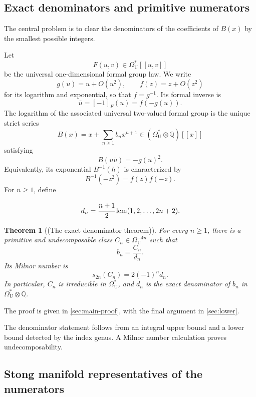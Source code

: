 \documentclass[14pt,dvipsnames]{extarticle}
\numberwithin{equation}{subsection}
\theoremstyle{plain}
\newtheorem{theorem}[theorem]{Theorem}
\theoremstyle{definition}
\theoremstyle{definition}
\DeclareMathOperator{\lcm}{lcm}
\newcommand{\OmU}{\Omega_{\mathrm U}^{\ast}}
\newcommand{\Uu}{\mathrm{U}}
\begin{document}
\subsection{Exact denominators and primitive numerators}

The central problem is to clear the denominators of the coefficients of
$B(x)$ by the smallest possible integers.

Let
\[
 F(u,v)\in\OmU[[u,v]]
\]
be the universal one-dimensional formal group law.  We write
\[
 g(u)=u+O(u^2),\qquad f(z)=z+O(z^2)
\]
for its logarithm and exponential, so that $f=g^{-1}$.  Its formal inverse is
\[
 \bar u=[-1]_F(u)=f(-g(u)).
\]
The logarithm of the associated universal two-valued formal group is the
unique strict series
\[
 B(x)=x+\sum_{n\geq1}b_nx^{n+1}
     \in (\OmU\otimes\mathbb{Q})[[x]]
\]
satisfying
\begin{equation}\label{eq:def-B}
 B(u\bar u)=-g(u)^2.
\end{equation}
Equivalently, its exponential $B^{-1}(h)$ is characterized by
\begin{equation}\label{eq:def-exp-B}
 B^{-1}(-z^2)=f(z)f(-z).
\end{equation}
For $n\geq1$, define

\begin{equation}\label{eq:def-dn}
\begin{aligned}
d_n = \cfrac{n+1}{2} \lcm(1,2,\ldots,2n+2).
 \end{aligned}
\end{equation}

\begin{theorem}[(The exact denominator theorem)]\label{thm:main}
For every $n\geq1$, there is a primitive and undecomposable class
$C_n\in\Omega_{\Uu}^{-4n}$ such that
\begin{equation}\label{b_n_as_fraction}
 b_n=\frac{C_n}{d_n}.
\end{equation}
Its Milnor number is
\[
 s_{2n}(C_n)=2(-1)^n d_n.
\]
In particular, $C_n$ is irreducible in $\OmU$, and $d_n$ is the exact
denominator of $b_n$ in $\OmU\otimes\mathbb{Q}$.
\end{theorem}

The proof is given in \cref{sec:main-proof}, with the final argument in \cref{sec:lower}.

The denominator statement follows from an integral upper bound and a lower
bound detected by the index genus. A Milnor number calculation proves
undecomposability.

\subsection{Stong manifold representatives of the numerators}
\end{document}
